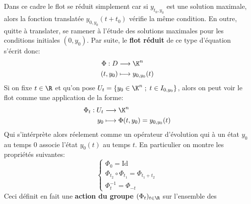 \subsection*{}
Dans ce cadre le flot se réduit simplement car si \( y_{t_0, y_0} \) est une solution maximale, alors la fonction translatée \( y_{0, y_0}(t + t_0)\) vérifie la même condition. En outre, quitte à translater, se ramener à l'étude des solutions maximales pour les conditions initiales \( (0, y_0) \). Par suite, le \textbf{flot réduit} de ce type d'équation s'écrit donc:
\[ 
   \begin{aligned}
      \Phi : D &\longrightarrow \K^n \\
      (t, y_0) &\longmapsto y_{0, y_0}(t)
   \end{aligned} 
\]
Si on fixe \( t \in \R \) et qu'on pose \( U_t = \left\{ y_0 \in \K^n \; ; \; t \in I_{0, y_0} \right\}  \), alors on peut voir le flot comme une application de la forme:
\[ 
   \begin{aligned}
      \Phi_t : U_t &\longrightarrow \K^n \\
      y_0 &\longmapsto \Phi(t, y_0) = y_{0, y_0}(t)
   \end{aligned}
\]
Qui s'intérprète alors réelement comme un opérateur d'évolution qui à un état \( y_0 \) au temps \( 0 \) associe l'état \( y_0(t) \) au temps \( t \). En particulier on montre les propriétés suivantes:
\[ 
   \begin{cases}
      \Phi_0 = \text{Id}\\
      \Phi_{t_2} \circ \Phi_{t_1} = \Phi_{t_1+t_2}\\
      \Phi_{t}^{-1} = \Phi_{-t}
   \end{cases} 
\]
Ceci définit en fait une \textbf{action du groupe} \( (\Phi_t)_{t \in \R}\) sur l'ensemble des 


